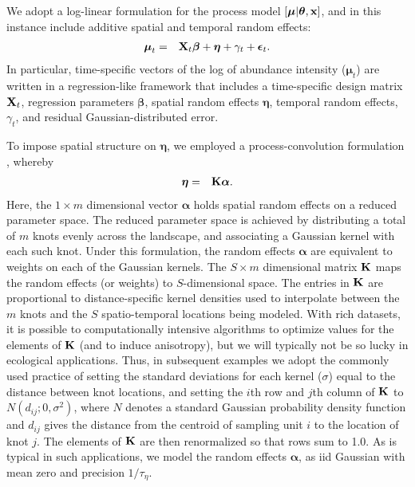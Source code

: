 \documentclass[12pt,fleqn]{article}
\begin{document}
\begin{flushleft}
\hspace{.5in} We adopt a log-linear formulation for the process model  $[\boldsymbol{\mu} | \boldsymbol{\theta},{\bf x}]$, and in this instance include additive spatial and temporal random effects:
\begin{eqnarray*}
  \boldsymbol{\mu}_t & = & {\bf X}_{t} \boldsymbol{\beta} + \boldsymbol{\eta} + \gamma_t + \boldsymbol{\epsilon}_t.
\end{eqnarray*}
In particular, time-specific vectors of the log of abundance intensity ($\boldsymbol{\mu}_t$) are written in a regression-like framework that includes a time-specific design matrix ${\bf X}_t$, regression parameters $\boldsymbol{\beta}$, spatial random effects $\boldsymbol{\eta}$, temporal random effects, $\gamma_t$, and residual Gaussian-distributed error.

\hspace{.5in} To impose spatial structure on $\boldsymbol{\eta}$, we employed a process-convolution formulation \citep[see e.g.,][]{Higdon1998,CalderEtAl2002}, whereby
\begin{eqnarray}
   \boldsymbol{\eta} & = & {\bf K} \boldsymbol{\alpha}.
 \label{eq:reduced-spat}
\end{eqnarray}
Here, the $1 \times m$ dimensional vector $\boldsymbol{\alpha}$ holds spatial random effects on a reduced parameter space.  The reduced parameter space is achieved by distributing a total of $m$ knots evenly across the landscape, and associating a Gaussian kernel with each such knot. Under this formulation, the random effects $\boldsymbol{\alpha}$ are equivalent to weights on each of the Gaussian kernels.  The $S \times m$ dimensional matrix ${\bf K}$ maps the random effects (or weights) to $S$-dimensional space.  The entries in ${\bf K}$ are proportional to distance-specific kernel densities used to interpolate between the $m$ knots and the $S$ spatio-temporal locations being modeled.  With rich datasets, it is possible to computationally intensive algorithms to optimize values for the elements of ${\bf K}$ (and to induce anisotropy), but we will typically not be so lucky in ecological applications.  Thus, in subsequent examples we adopt the commonly used practice of setting the standard deviations for each kernel ($\sigma$) equal to the distance between knot locations, and setting the $i$th row and $j$th column of ${\bf K}$ to $N(d_{ij}; 0,\sigma^2)$, where $N$ denotes a standard Gaussian probability density function and $d_{ij}$ gives the distance from the centroid of sampling unit $i$ to the location of knot $j$.  The elements of ${\bf K}$ are then renormalized so that rows sum to 1.0.
As is typical in such applications, we model the random effects $\boldsymbol{\alpha}$, as iid Gaussian with mean zero and precision $1/\tau_\eta$.


\end{flushleft}
\end{document}
